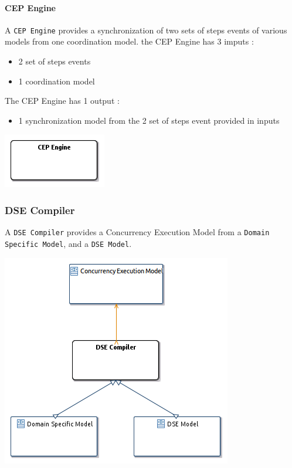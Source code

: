 \documentclass{gemoc} %
\begin{document}
\paragraph{CEP Engine}
\label{sec:CEP_Engine}
A \texttt{CEP Engine} provides a synchronization of two sets of steps events of various models from one coordination model.
\newline the CEP Engine has 3 imputs :
\begin{itemize}
\item 2 set of steps events
\item 1 coordination model
\end{itemize}
The CEP Engine has 1 output :
\begin{itemize}
\item 1 synchronization model from the 2 set of steps event provided in inputs
\end{itemize}
\begin{center}
\includegraphics*[trim=0.0cm 0.0cm 0cm 0.0cm, clip=true]{../images/generated/Generated_CEP_Engine.png}
\end{center}





\subsubsection{DSE Compiler}
\label{sec:DSE_Compiler}
A \texttt{DSE Compiler} provides a Concurrency Execution Model from a \texttt{Domain Specific Model}, and a \texttt{DSE Model}.
\begin{center}
\includegraphics*[trim=0.0cm 0.0cm 0cm 0.0cm, clip=true]{../images/generated/Generated_DSE_Compiler.png}
\end{center}
\end{document}
